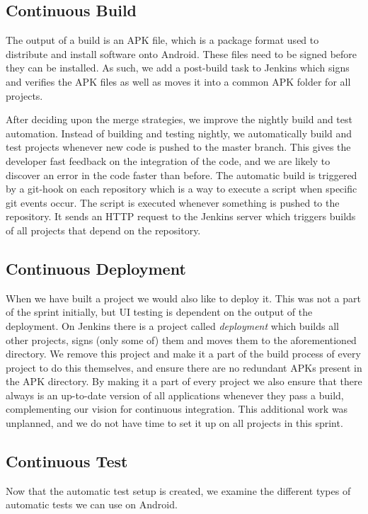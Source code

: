
\subsection{Continuous Build}
The output of a build is an APK file, which is a package format used to distribute and install software onto Android. These files need to be signed before they can be installed. As such, we add a post-build task to Jenkins which signs and verifies the APK files as well as moves it into a common APK folder for all projects.

After deciding upon the merge strategies, we improve the nightly build and test automation. Instead of building and testing nightly, we automatically build and test projects whenever new code is pushed to the master branch. This gives the developer fast feedback on the integration of the code, and we are likely to discover an error in the code faster than before. The automatic build is triggered by a git-hook on each repository which is a way to execute a script when specific git events occur. The script is executed whenever something is pushed to the repository. It sends an HTTP request to the Jenkins server which triggers builds of all projects that depend on the repository.
\subsection{Continuous Deployment}
\label{sec:auto_deploy}
When we have built a project we would also like to deploy it. This was not a part of the sprint initially, but UI testing is dependent on the output of the deployment. On Jenkins there is a project called \emph{deployment} which builds all other projects, signs (only some of) them and moves them to the aforementioned directory. We remove this project and make it a part of the build process of every project to do this themselves, and ensure there are no redundant APKs present in the APK directory. By making it a part of every project we also ensure that there always is an up-to-date version of all applications whenever they pass a build, complementing our vision for continuous integration. This additional work was unplanned, and we do not have time to set it up on all projects in this sprint. 

\subsection{Continuous Test}
\label{sec:test_automation}
Now that the automatic test setup is created, we examine the different types of automatic tests we can use on Android.


